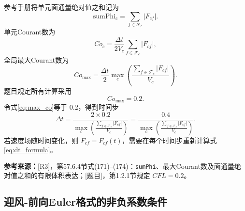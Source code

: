 \documentclass[UTF8,12pt,a4paper]{ctexart}
\numberwithin{equation}{section}
\newcommand{\Rthree}{\textnormal{[R3]}}
\newcommand{\Task}{\textnormal{[题目]}}
\newcommand{\source}[1]{%
  \par\smallskip
  \noindent\colorbox{sourcebg}{%
    \parbox{0.955\linewidth}{\footnotesize\color{sourcegray}\textbf{参考来源：}#1}%
  }
  \par\smallskip
}
\begin{document}
参考手册将单元面通量绝对值之和记为
\begin{equation}
  \mathrm{sumPhi}_c
  =\sum_{f\in\mathcal F_c}|F_{cf}|.
  \label{eq:sumphi}
\end{equation}
单元Courant数为
\begin{equation}
  Co_c
  =\frac{\Delta t}{2V_c}
  \sum_{f\in\mathcal F_c}|F_{cf}|,
  \label{eq:local_co}
\end{equation}
全局最大Courant数为
\begin{equation}
  Co_{\max}
  =\frac{\Delta t}{2}
  \max_c\left(
    \frac{\sum_{f\in\mathcal F_c}|F_{cf}|}{V_c}
  \right).
  \label{eq:max_co}
\end{equation}
题目规定所有计算采用
\begin{equation}
  Co_{\max}=0.2.
  \label{eq:co_task}
\end{equation}
令式\eqref{eq:max_co}等于 $0.2$，得到时间步
\begin{equation}
  \boxed{
  \Delta t
  =\frac{2\times0.2}{
    \displaystyle
    \max_c\left(
      \frac{\sum_{f\in\mathcal F_c}|F_{cf}|}{V_c}
    \right)}
  =\frac{0.4}{
    \displaystyle
    \max_c\left(
      \frac{\sum_{f\in\mathcal F_c}|F_{cf}|}{V_c}
    \right)}
  }.
  \label{eq:dt_formula}
\end{equation}
若速度场随时间变化，则 $F_{cf}=F_{cf}(t)$，需要在每个时间步重新计算式\eqref{eq:dt_formula}。

\source{\Rthree，第57.6.4节式(171)--(174)：\texttt{sumPhi}、最大Courant数及面通量绝对值之和的有限体积表达；\Task，第1.2.1节规定 $CFL=0.2$。}

\subsection{迎风-前向Euler格式的非负系数条件}
\end{document}
